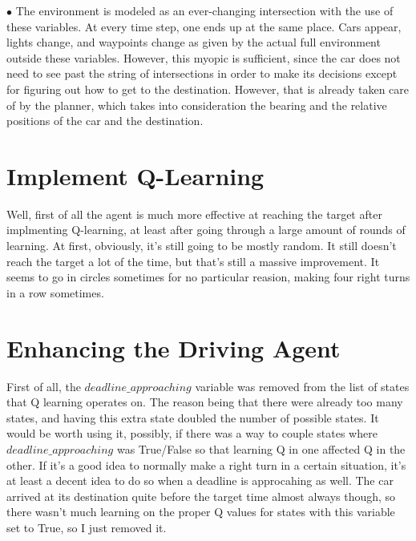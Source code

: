 \documentclass{amsart}
\begin{document}
\begin{list}{$\bullet$}{\addtolength{\parsep}{1mm}}
The environment is modeled as an ever-changing intersection with the use of these variables.  At every time step, one ends up at the same place.  Cars appear, lights change, and waypoints change as given by the actual full environment outside these variables.  However, this myopic is sufficient, since the car does not need to see past the string of intersections in order to make its decisions except for figuring out how to get to the destination.  However, that is already taken care of by the planner, which takes into consideration the bearing and the relative positions of the car and the destination.
\end{list}
\section{Implement Q-Learning}
Well, first of all the agent is much more effective at reaching the target after implmenting Q-learning, at least after going through a large amount of rounds of learning.  At first, obviously, it's still going to be mostly random.  It still doesn't reach the target a lot of the time, but that's still a massive improvement.    It seems to go in circles sometimes for no particular reasion, making four right turns in a row sometimes.  
\section{Enhancing the Driving Agent}
First of all, the $deadline\_approaching$ variable was removed from the list of states that Q learning operates on.  The reason being that there were already too many states, and having this extra state doubled the number of possible states.  It would be worth using it, possibly, if there was a way to couple states where $deadline\_approaching$ was True/False so that learning Q in one affected Q in the other.  If it's a good idea to normally make a right turn in a certain situation, it's at least a decent idea to do so when a deadline is approcahing as well.  The car arrived at its destination quite before the target time almost always though, so there wasn't much learning on the proper Q values for states with this variable set to True, so I just removed it.
\end{document}
